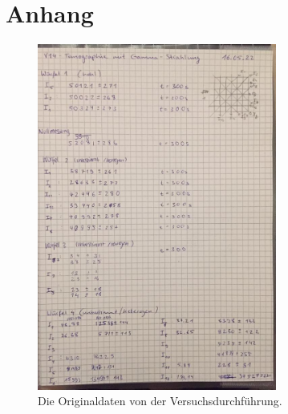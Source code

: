 \newpage
\section{Anhang}
\label{sec:anhang}
\begin{figure}[h]
    \centering
    \includegraphics[width=0.7\textwidth]{bilder/Originaldaten.jpeg}
    \caption{Die Originaldaten von der Versuchsdurchführung.}
    \label{fig:originaldaten}
\end{figure}
\newpage